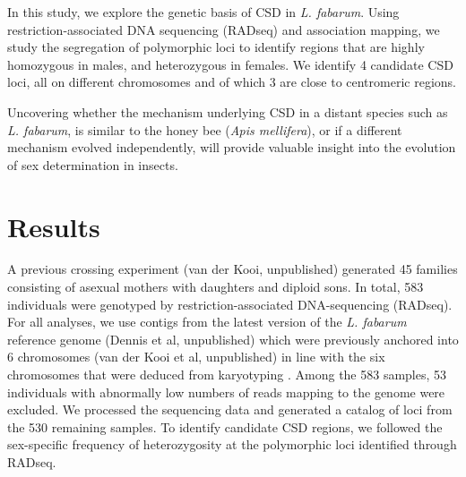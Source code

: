 \documentclass[11pt,a4paper]{report}
\begin{document}
In this study, we explore the genetic basis of CSD in \textit{L. fabarum}. Using restriction-associated DNA sequencing (RADseq) \citep{Davey2010} and association mapping, we study the segregation of polymorphic loci to identify regions that are highly homozygous in males, and heterozygous in females. We identify 4 candidate CSD loci, all on different chromosomes and of which 3 are close to centromeric regions. 

Uncovering whether the mechanism underlying CSD in a distant species such as \textit{L. fabarum}, is similar to the honey bee (\textit{Apis mellifera}), or if a different mechanism evolved independently, will provide valuable insight into the evolution of sex determination in insects.

\section{Results}
A previous crossing experiment (van der Kooi, unpublished) generated 45 families consisting of asexual mothers with daughters and diploid sons. In total, 583 individuals were genotyped by restriction-associated DNA-sequencing (RADseq). For all analyses, we use contigs from the latest version of the \textit{L. fabarum} reference genome (Dennis et al, unpublished) which were previously anchored into 6 chromosomes (van der Kooi et al, unpublished) in line with the six chromosomes that were deduced from karyotyping \citep{Belshaw2003}. Among the 583 samples, 53 individuals with abnormally low numbers of reads mapping to the genome were excluded. We processed the sequencing data and generated a catalog of loci from the 530 remaining samples. To identify candidate CSD regions, we followed the sex-specific frequency of heterozygosity at the polymorphic loci identified through RADseq.
\end{document}
